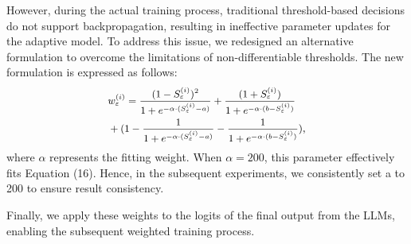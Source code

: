 However, during the actual training process, traditional threshold-based decisions do not support backpropagation, resulting in ineffective parameter updates for the adaptive model. To address this issue, we redesigned an alternative formulation to overcome the limitations of non-differentiable thresholds. The new formulation is expressed as follows:
\begin{equation}
\small
\begin{aligned}
&w_{\varepsilon}^{(i)} = \frac{(1 - S_\varepsilon^{(i)})^2}{1 + e^{-\alpha \cdot ( S_\varepsilon^{(i)} - a)}}   + \frac{ (1 + S_\varepsilon^{(i)})}{1 + e^{-\alpha \cdot (b - S_\varepsilon^{(i)})}}  \\
& + (1 -  \frac{1}{1 + e^{-\alpha \cdot ( S_\varepsilon^{(i)} - a)}} - \frac{1}{1 + e^{-\alpha \cdot (b - S_\varepsilon^{(i)})}}),
\end{aligned}
\end{equation}
where $\alpha$ represents the fitting weight. When $\alpha = 200$, this parameter effectively fits Equation (16). Hence, in the subsequent experiments, we consistently set a to 200 to ensure result consistency.

Finally, we apply these weights to the logits of the final output from the LLMs, enabling the subsequent weighted training process.